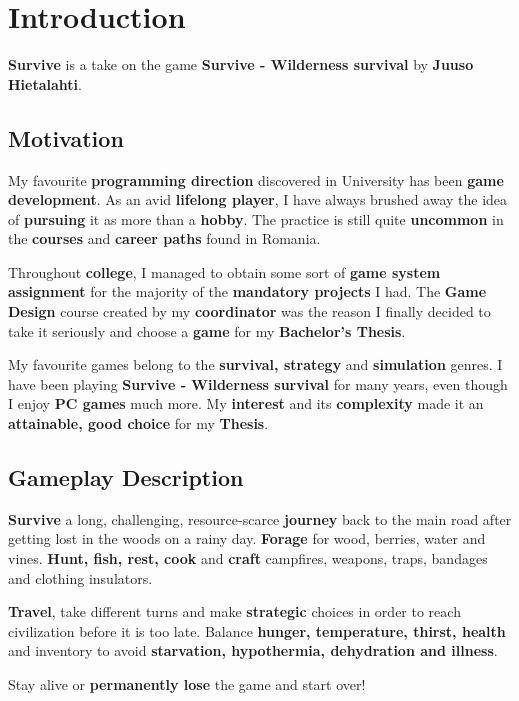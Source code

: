 \chapter*{Introduction}
	\par \textbf{Survive} is a take on the game \textbf{Survive - Wilderness survival}\cite{Survive} by \textbf{Juuso Hietalahti}\cite{Juuso}.

	\section*{Motivation}
		\par My favourite \textbf{programming direction} discovered in University has been \textbf{game development}. As an avid \textbf{lifelong player}, I have always brushed away the idea of \textbf{pursuing} it as more than a \textbf{hobby}. The practice is still quite \textbf{uncommon} in the \textbf{courses} and \textbf{career paths} found in Romania. 
		\par Throughout \textbf{college}, I managed to obtain some sort of \textbf{game system assignment} for the majority of the \textbf{mandatory projects} I had. The \textbf{Game Design}\cite{Course} course created by my \textbf{coordinator} was the reason I finally decided to take it seriously and choose a \textbf{game} for my \textbf{Bachelor's Thesis}.
		\par My favourite games belong to the \textbf{survival, strategy} and \textbf{simulation} genres. I have been playing \textbf{Survive - Wilderness survival} for many years, even though I enjoy \textbf{PC games} much more.  My \textbf{interest} and its \textbf{complexity} made it an \textbf{attainable, good choice} for my \textbf{Thesis}. 


	\section*{Gameplay Description}
		\par \textbf{Survive} a long, challenging, resource-scarce \textbf{journey} back to the main road after getting lost in the woods on a rainy day. \textbf{Forage} for wood, berries, water and vines. \textbf{Hunt, fish, rest, cook} and \textbf{craft} campfires, weapons, traps, bandages and clothing insulators.
    	\par \textbf{Travel}, take different turns and make \textbf{strategic} choices in order to reach civilization before it is too late. Balance \textbf{hunger, temperature, thirst, health} and inventory to avoid \textbf{starvation, hypothermia, dehydration and illness}.
    	\par Stay alive or \textbf{permanently lose} the game and start over!

